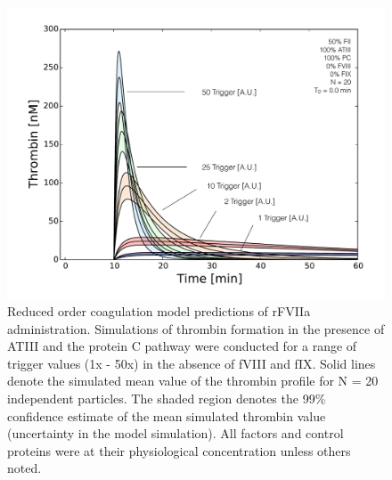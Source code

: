 \documentclass[12pt]{article}
\begin{document}
\begin{figure}
\centering
\includegraphics[width=1.0\textwidth]{./figs/Figure-7-rFVIIa-Trigger.pdf}
\caption{Reduced order coagulation model predictions of rFVIIa administration. 
Simulations of thrombin formation in the presence of ATIII and the protein C pathway were conducted for a range of trigger values (1x - 50x) in the absence of fVIII and fIX.
Solid lines denote the simulated mean value of the thrombin profile for N = 20 independent particles.
The shaded region denotes the 99\% confidence estimate of the mean simulated thrombin value (uncertainty in the model simulation). 
All factors and control proteins were at their physiological concentration unless others noted.}\label{fig-rFVII}
\end{figure}

\clearpage
\end{document}
